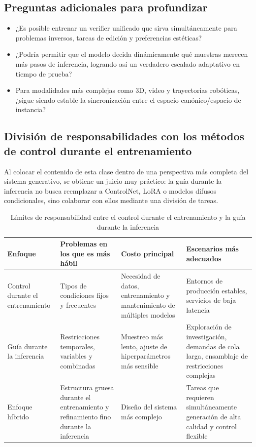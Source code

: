 \subsection{Preguntas adicionales para profundizar}

\begin{itemize}
    \item ¿Es posible entrenar un verifier unificado que sirva simultáneamente para problemas inversos, tareas de edición y preferencias estéticas?
    \item ¿Podría permitir que el modelo decida dinámicamente qué muestras merecen más pasos de inferencia, logrando así un verdadero escalado adaptativo en tiempo de prueba?
    \item Para modalidades más complejas como 3D, video y trayectorias robóticas, ¿sigue siendo estable la sincronización entre el espacio canónico/espacio de instancia?
\end{itemize}

\subsection{División de responsabilidades con los métodos de control durante el entrenamiento}

Al colocar el contenido de esta clase dentro de una perspectiva más completa del sistema generativo, se obtiene un juicio muy práctico: la guía durante la inferencia no busca reemplazar a ControlNet, LoRA o modelos difusos condicionales, sino colaborar con ellos mediante una división de tareas.

\begin{table}[H]
\centering
\begin{tabular}{p{} p{} p{} p{}}
\toprule
Enfoque & Problemas en los que es más hábil & Costo principal & Escenarios más adecuados \\
\midrule
Control durante el entrenamiento & Tipos de condiciones fijos y frecuentes & Necesidad de datos, entrenamiento y mantenimiento de múltiples modelos & Entornos de producción estables, servicios de baja latencia \\
Guía durante la inferencia & Restricciones temporales, variables y combinadas & Muestreo más lento, ajuste de hiperparámetros más sensible & Exploración de investigación, demandas de cola larga, ensamblaje de restricciones complejas \\
Enfoque híbrido & Estructura gruesa durante el entrenamiento y refinamiento fino durante la inferencia & Diseño del sistema más complejo & Tareas que requieren simultáneamente generación de alta calidad y control flexible \\
\bottomrule
\end{tabular}
\caption{Límites de responsabilidad entre el control durante el entrenamiento y la guía durante la inferencia}
\end{table}


